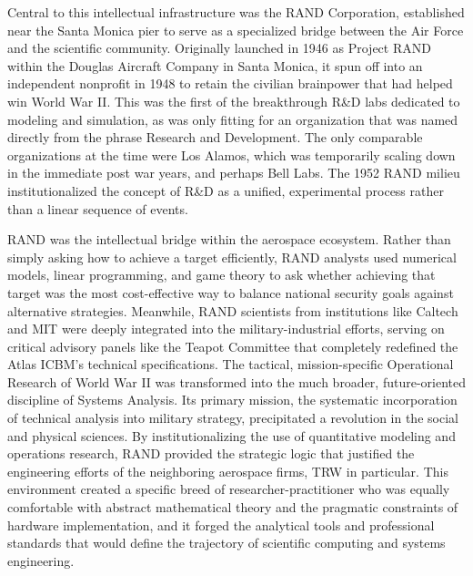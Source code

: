 Central to this intellectual infrastructure was the RAND Corporation, established near the Santa Monica pier to serve as a specialized bridge between the Air Force and the scientific community. Originally launched in 1946 as Project RAND within the Douglas Aircraft Company in Santa Monica, it spun off into an independent nonprofit in 1948 to retain the civilian brainpower that had helped win World War II. This was the first of the breakthrough R\&D labs dedicated to modeling and simulation, as was only fitting for an organization that was named directly from the phrase Research and Development. The only comparable organizations at the time were Los Alamos, which was temporarily scaling down in the immediate post war years, and perhaps Bell Labs. The 1952 RAND milieu institutionalized the concept of R\&D as a unified, experimental process rather than a linear sequence of events. 

RAND was the intellectual bridge within the aerospace ecosystem. Rather than simply asking how to achieve a target efficiently, RAND analysts used numerical models, linear programming, and game theory to ask whether achieving that target was the most cost-effective way to balance national security goals against alternative strategies. Meanwhile, RAND scientists from institutions like Caltech and MIT were deeply integrated into the military-industrial efforts, serving on critical advisory panels like the Teapot Committee that completely redefined the Atlas ICBM's technical specifications. The tactical, mission-specific Operational Research of World War II was transformed into the much broader, future-oriented discipline of Systems Analysis. Its primary mission, the systematic incorporation of technical analysis into military strategy, precipitated a revolution in the social and physical sciences. By institutionalizing the use of quantitative modeling and operations research, RAND provided the strategic logic that justified the engineering efforts of the neighboring aerospace firms, TRW in particular. This environment created a specific breed of researcher-practitioner who was equally comfortable with abstract mathematical theory and the pragmatic constraints of hardware implementation, and it forged the analytical tools and professional standards that would define the trajectory of scientific computing and systems engineering.

